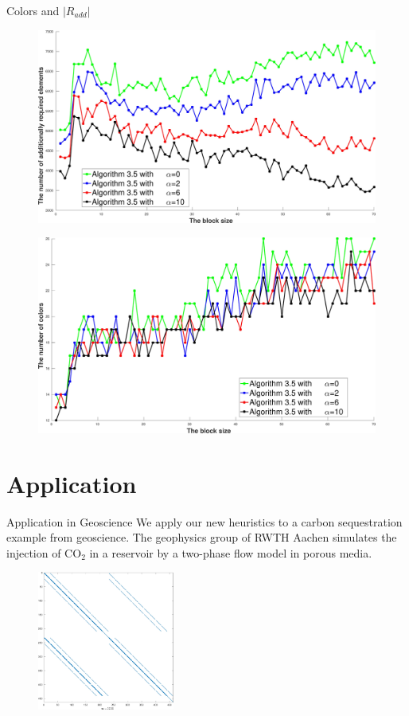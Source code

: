 \documentclass{beamer}
\begin{document}
\begin{frame}{Colors and $|R_{add}|$}
\begin{figure}
\centering
\includegraphics[width=0.5\linewidth]{ex33_alg35_alpha_0_2_6_10_bls_lfo_adds}
\end{figure}

\begin{figure}
\centering
\includegraphics[width=0.5\linewidth]{ex33_alg35_alpha_0_2_6_10_bls_lfo_cols}
\end{figure}
\end{frame}

\section{Application}
\begin{frame}{Application in Geoscience}
We apply our new heuristics to a carbon sequestration example from geoscience.
The geophysics group of RWTH Aachen simulates the injection of CO$_2$ in a reservoir by a
two-phase flow model in porous media.
\begin{figure}
\centering
\includegraphics[width=0.4\textwidth]{co2_jac}
\end{figure}
\end{frame}
\end{document}

